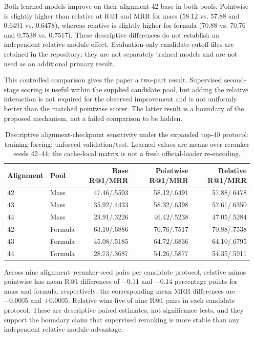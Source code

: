 \documentclass[runningheads]{llncs}
\begin{document}
Both learned models improve on their alignment-42 base in both pools. Pointwise
is slightly higher than relative at R@1 and MRR for mass (58.12 vs. 57.88 and
0.6491 vs. 0.6478), whereas relative is slightly higher for formula (70.88 vs.
70.76 and 0.7538 vs. 0.7517). These descriptive differences do not establish
an independent relative-module effect. Evaluation-only candidate-cutoff files
are retained in the repository; they are not separately trained models and are
not used as an additional primary result.

This controlled comparison gives the paper a two-part result. Supervised
second-stage scoring is useful within the supplied candidate pool, but adding
the relative interaction is not required for the observed improvement and is
not uniformly better than the matched pointwise scorer. The latter result is a
boundary of the proposed mechanism, not a failed comparison to be hidden.

\begin{table}[t]
  \centering
  \caption{Descriptive alignment-checkpoint sensitivity under the expanded
  top-40 protocol: training forcing, unforced validation/test. Learned values
  are means over reranker seeds 42--44; the cache-local matrix is not a fresh
  official-loader re-encoding.}
  \label{tab:alignment_sensitivity}
  \scriptsize
  \setlength{\tabcolsep}{3pt}
  \begin{tabular}{@{}llrrr@{}}
    \toprule
    Alignment & Pool & Base R@1/MRR & Pointwise R@1/MRR & Relative R@1/MRR \\
    \midrule
    42 & Mass & 47.46/.5503 & 58.12/.6491 & 57.88/.6478 \\
    43 & Mass & 35.92/.4433 & 58.32/.6398 & 57.61/.6350 \\
    44 & Mass & 23.91/.3226 & 46.42/.5238 & 47.05/.5284 \\
    \midrule
    42 & Formula & 63.10/.6886 & 70.76/.7517 & 70.88/.7538 \\
    43 & Formula & 45.08/.5185 & 64.72/.6836 & 64.10/.6795 \\
    44 & Formula & 28.73/.3687 & 54.26/.5877 & 54.35/.5911 \\
    \bottomrule
  \end{tabular}
\end{table}

Across nine alignment--reranker-seed pairs per candidate protocol, relative minus
pointwise has mean R@1 differences of $-0.11$ and $-0.14$ percentage points
for mass and formula, respectively; the corresponding mean MRR differences
are $-0.0005$ and $+0.0005$. Relative wins five of nine R@1 pairs in each
candidate protocol. These are descriptive paired estimates, not significance
tests, and they support the boundary claim that supervised reranking is more
stable than any independent relative-module advantage.
\end{document}
